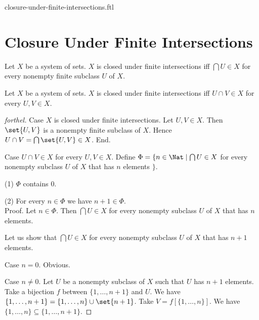 \documentclass{naproche-library}
\begin{document}
\begin{smodule}{closure-under-finite-intersections.ftl}

  \section*{Closure Under Finite Intersections}

  \begin{definition}[forthel,id=FOUNDATIONS_14_4297814324543488,printid]
    Let $X$ be a system of sets.
    $X$ is closed under finite intersections iff $\bigcap U \in X$ for every nonempty finite subclass $U$ of $X$.
  \end{definition}

  \begin{proposition}[forthel,id=FOUNDATIONS_17_1405012582334464,printid]
    Let $X$ be a system of sets.
    $X$ is closed under finite intersections iff $U \cap V \in X$ for every $U, V \in X$.
  \end{proposition}
  \begin{proof}[forthel]
    Case $X$ is closed under finite intersections.
      Let $U, V \in X$.
      Then $\set{U, V}$ is a nonempty finite subclass of $X$.
      Hence $U \cap V = \bigcap \set{U, V} \in X$.
    End.

    Case $U \cap V \in X$ for every $U, V \in X$.
      Define $\Phi = \{ n \in \Nat \mid \bigcap U \in X$ for every nonempty subclass $U$ of $X$ that has $n$ elements $\}$.

      (1) $\Phi$ contains $0$.

      (2) For every $n \in \Phi$ we have $n + 1 \in \Phi$. \\
      Proof.
        Let $n \in \Phi$.
        Then $\bigcap U \in X$ for every nonempty subclass $U$ of $X$ that has $n$ elements.

        Let us show that $\bigcap U \in X$ for every nonempty subclass $U$ of $X$ that has $n + 1$ elements.

          Case $n = 0$. Obvious.

          Case $n \neq 0$.
            Let $U$ be a nonempty subclass of $X$ such that $U$ has $n + 1$ elements.
            Take a bijection $f$ between $\{1, \dots, n + 1 \}$ and $U$.
            We have $\{ 1, \dots, n + 1 \} = \{ 1, \dots, n \} \cup \set{n + 1}$.
            Take $V = f[\{ 1, \dots, n \}]$.
            We have $\{ 1, \dots, n \} \subseteq \{ 1, \dots, n + 1 \}$.


\end{proof}
\end{smodule}
\end{document}
